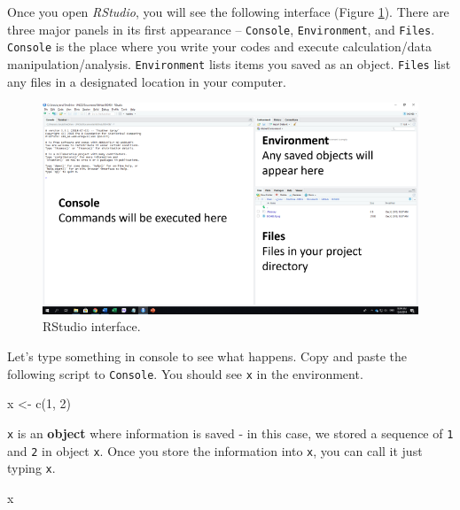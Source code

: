 \documentclass[
]{book}
\newenvironment{Shaded}{\begin{snugshade}}{\end{snugshade}}
\newcommand{\DecValTok}[1]{\textcolor[rgb]{0.00,0.00,0.81}{#1}}
\newcommand{\FunctionTok}[1]{\textcolor[rgb]{0.00,0.00,0.00}{#1}}
\newcommand{\NormalTok}[1]{#1}
\newcommand{\OtherTok}[1]{\textcolor[rgb]{0.56,0.35,0.01}{#1}}
\begin{document}
Once you open \emph{RStudio}, you will see the following interface (Figure \ref{fig:ui}). There are three major panels in its first appearance -- \texttt{Console}, \texttt{Environment}, and \texttt{Files}. \texttt{Console} is the place where you write your codes and execute calculation/data manipulation/analysis. \texttt{Environment} lists items you saved as an object. \texttt{Files} list any files in a designated location in your computer.

\begin{figure}

{\centering \includegraphics[width=9.47in]{image/r_image01} 

}

\caption{RStudio interface.}\label{fig:ui}
\end{figure}

Let's type something in console to see what happens. Copy and paste the following script to \texttt{Console}. You should see \texttt{x} in the environment.

\begin{Shaded}
\begin{Highlighting}[]
\NormalTok{x }\OtherTok{\textless{}{-}} \FunctionTok{c}\NormalTok{(}\DecValTok{1}\NormalTok{, }\DecValTok{2}\NormalTok{)}
\end{Highlighting}
\end{Shaded}

\texttt{x} is an \textbf{object} where information is saved - in this case, we stored a sequence of \texttt{1} and \texttt{2} in object \texttt{x}. Once you store the information into \texttt{x}, you can call it just typing \texttt{x}.

\begin{Shaded}
\begin{Highlighting}[]
\NormalTok{x}
\end{Highlighting}
\end{Shaded}
\end{document}
